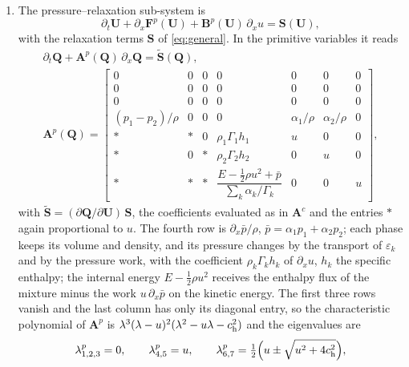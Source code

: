 \documentclass[a4paper,fleqn]{cas-sc}
\begin{document}
\begin{enumerate}
The characteristic speeds are the flow velocity and zero. The volume fraction is transported only by this sub-system; in
the pressure--relaxation sub-system it changes only through the relaxation terms.
\item The pressure--relaxation sub-system is
\begin{equation}
\partial_t\mathbf U+\partial_x\mathbf F^p(\mathbf U)+\mathbf B^p(\mathbf U)\,\partial_xu=\mathbf S(\mathbf U),
\label{eq:pressure_sub}
\end{equation}
with the relaxation terms $\mathbf S$ of \eqref{eq:general}. In the primitive variables it reads
\begin{equation}
\begin{gathered}
\partial_t\mathbf Q+\mathbf A^p(\mathbf Q)\,\partial_x\mathbf Q=\tilde{\mathbf S}(\mathbf Q),\\
\mathbf A^p(\mathbf Q)=\begin{bmatrix}
0&0&0&0&0&0&0\\
0&0&0&0&0&0&0\\
0&0&0&0&0&0&0\\
(p_1-p_2)/\rho&0&0&0&\alpha_1/\rho&\alpha_2/\rho&0\\
\ast&\ast&0&\rho_1\Gamma_1h_1&u&0&0\\
\ast&0&\ast&\rho_2\Gamma_2h_2&0&u&0\\
\ast&\ast&\ast&\dfrac{E-\tfrac12\rho u^2+\bar p}{\sum_k\alpha_k/\Gamma_k}&0&0&u
\end{bmatrix},
\end{gathered}
\label{eq:Ap}
\end{equation}
with $\tilde{\mathbf S}=(\partial\mathbf Q/\partial\mathbf U)\,\mathbf S$, the coefficients evaluated as in $\mathbf A^c$ and the entries $\ast$ again proportional to $u$. The fourth row is $\partial_x\bar p/\rho$,
$\bar p=\alpha_1p_1+\alpha_2p_2$; each phase keeps its volume and density, and its pressure changes by the transport of $\varepsilon_k$ and by
the pressure work, with the coefficient $\rho_k\Gamma_kh_k$ of $\partial_xu$, $h_k$ the specific enthalpy; the internal energy $E-\tfrac12\rho u^2$ receives
the enthalpy flux of the mixture minus the work $u\,\partial_x\bar p$ on the kinetic energy. The first three rows vanish and the last
column has only its diagonal entry, so the characteristic polynomial of $\mathbf A^p$ is $\lambda^3(\lambda-u)^2(\lambda^2-u\lambda-c_{\rm h}^2)$ and the
eigenvalues are
\begin{equation}
\begin{gathered}
\lambda^p_{1,2,3}=0,\qquad\lambda^p_{4,5}=u,\qquad \lambda^p_{6,7}=\tfrac12\Big(u\pm\sqrt{u^2+4c_{\rm h}^2}\Big),\\

\end{gathered}
\end{equation}
\end{enumerate}
\end{document}
